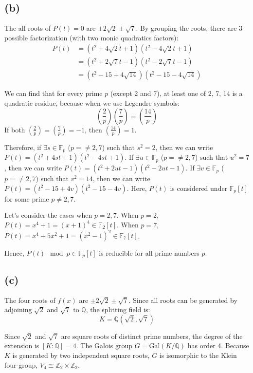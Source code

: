 \documentclass[12pt]{article}
\theoremstyle{definition}
\theoremstyle{remark}
\begin{document}
\subsection*{(b)}
The all roots of $P(t)=0$ are $\pm 2\sqrt{2}\pm \sqrt{7}$. By grouping the roots, there are 3 possible factorization (with two monic quadratics factors):
\begin{align*}
    P(t)&=(t^2+4\sqrt{2}t+1)(t^2-4\sqrt{2}t+1) \\
    &=(t^2+2\sqrt{7}t-1)(t^2-2\sqrt{7}t-1) \\
    &=(t^2-15+4\sqrt{14})(t^2-15-4\sqrt{14})
\end{align*}

We can find that for every prime $p$ (except 2 and 7), at least one of 2, 7, 14 is a quadratic residue, because when we use Legendre symbols:
$$\left(\frac{2}{p}\right)\left(\frac{7}{p}\right)=\left(\frac{14}{p}\right)$$
If both $\left(\frac{2}{p}\right)=\left(\frac{7}{p}\right)=-1$, then $\left(\frac{14}{p}\right)=1$.

Therefore, if $\exists s\in \mathbb{F}_p$ ($p=\ne2,7$) such that $s^2=2$, then we can write $P(t)=(t^2+4st+1)(t^2-4st+1)$. If $\exists u\in \mathbb{F}_p$ ($p=\ne2,7$) such that $u^2=7$, then we can write $P(t)=(t^2+2ut-1)(t^2-2ut-1)$. If $\exists v\in \mathbb{F}_p$ ($p=\ne2,7$) such that $v^2=14$, then we can write $P(t)=(t^2-15+4v)(t^2-15-4v)$. Here, $P(t)$ is considered under $\mathbb{F}_p[t]$ for some prime $p\ne 2,7$.

Let's consider the cases when $p=2,7$. When $p=2$, $P(t)=x^4+1=(x+1)^{4}\in \mathbb{F}_2[t]$. When $p=7$, $P(t)=x^4+5x^2+1=(x^2-1)^2\in \mathbb{F}_7[t]$.

Hence, $P(t)\mod p\in \mathbb{F}_p[t]$ is reducible for all prime numbers $p$.

\subsection*{(c)}
The four roots of $f(x)$ are $\pm 2\sqrt{2} \pm \sqrt{7}$. Since all roots can be generated by adjoining $\sqrt{2}$ and $\sqrt{7}$ to $\mathbb{Q}$, the splitting field is:
$$K = \mathbb{Q}(\sqrt{2}, \sqrt{7})$$

Since $\sqrt{2}$ and $\sqrt{7}$ are square roots of distinct prime numbers, the degree of the extension is $[K:\mathbb{Q}] = 4$. The Galois group $G = \text{Gal}(K/\mathbb{Q})$ has order 4. Because $K$ is generated by two independent square roots, $G$ is isomorphic to the Klein four-group, $V_4 \cong \mathbb{Z}_2 \times \mathbb{Z}_2$.
\end{document}
